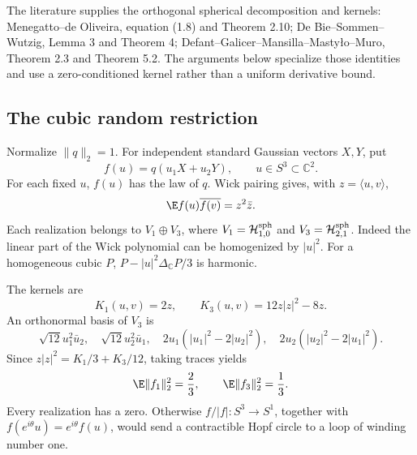 The literature supplies the orthogonal spherical decomposition and kernels: Menegatto--de Oliveira, equation (1.8) and Theorem 2.10; De Bie--Sommen--Wutzig, Lemma 3 and Theorem 4; Defant--Galicer--Mansilla--Masty\l o--Muro, Theorem 2.3 and Theorem 5.2. The arguments below specialize those identities and use a zero-conditioned kernel rather than a uniform derivative bound.

\subsection{The cubic random restriction}
Normalize $\|q\|_2=1$. For independent standard Gaussian vectors $X,Y$, put
\[
 f(u)=q(u_1X+u_2Y),\qquad u\in S^3\subset\mathbb C^2.
\]
For each fixed $u$, $f(u)$ has the law of $q$. Wick pairing gives, with $z=\langle u,v\rangle$,
\[
 \E f(u)\overline{f(v)}=z^2\bar z.
\]
Each realization belongs to $V_1\oplus V_3$, where $V_1=\mathcal H_{1,0}^{\rm sph}$ and $V_3=\mathcal H_{2,1}^{\rm sph}$. Indeed the linear part of the Wick polynomial can be homogenized by $|u|^2$. For a homogeneous cubic $P$, $P-|u|^2\Delta_{\mathbb C}P/3$ is harmonic.

The kernels are
\[
 K_1(u,v)=2z,\qquad K_3(u,v)=12z|z|^2-8z.
\]
An orthonormal basis of $V_3$ is
\[
 \sqrt{12}u_1^2\bar u_2,\quad \sqrt{12}u_2^2\bar u_1,\quad
 2u_1(|u_1|^2-2|u_2|^2),\quad 2u_2(|u_2|^2-2|u_1|^2).
\]
Since $z|z|^2=K_1/3+K_3/12$, taking traces yields
\begin{equation}\label{eq:sk-energy}
 \E\|f_1\|_2^2=\frac23,\qquad \E\|f_3\|_2^2=\frac13.
\end{equation}
Every realization has a zero. Otherwise $f/|f|:S^3\to S^1$, together with $f(e^{i\theta}u)=e^{i\theta}f(u)$, would send a contractible Hopf circle to a loop of winding number one.

